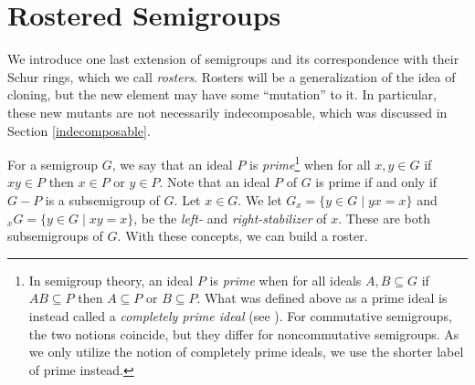 \documentclass{article}
\theoremstyle{plain}
\theoremstyle{definition}
\begin{document}
\section{Rostered Semigroups}\label{sec:roster}
We introduce one last extension of semigroups and its correspondence with their Schur rings, which we call \emph{rosters}. Rosters will be a generalization of the idea of cloning, but the new element may have some ``mutation'' to it. In particular, these new mutants are not necessarily indecomposable, which was discussed in Section \ref{indecomposable}. 

For a semigroup $G$, we say that an ideal $P$ is \emph{prime}\footnote{In semigroup theory, an ideal $P$ is \emph{prime} when for all ideals $A,B\subseteq G$ if $AB\subseteq P$ then $A\subseteq P$ or $B\subseteq P$. What was defined above as a prime ideal is instead called a \emph{completely prime ideal} (see \cite{Park}). For commutative semigroups, the two notions coincide, but they differ for noncommutative semigroups. As we only utilize the notion of completely prime ideals, we use the shorter label of prime instead.} when for all $x,y\in G$ if $xy\in P$ then $x\in P$ or $y\in P$. Note that an ideal $P$ of $G$ is prime if and only if $G-P$ is a subsemigroup of $G$. Let $x\in G$. We let \label{lstab}$G_x = \{y\in G\mid yx=x\}$ and \label{rstab}$_xG = \{y\in G\mid xy=x\}$, be the \emph{left-} and \emph{right-stabilizer} of $x$. These are both subsemigroups of $G$. With these concepts, we can build a roster.
\end{document}
